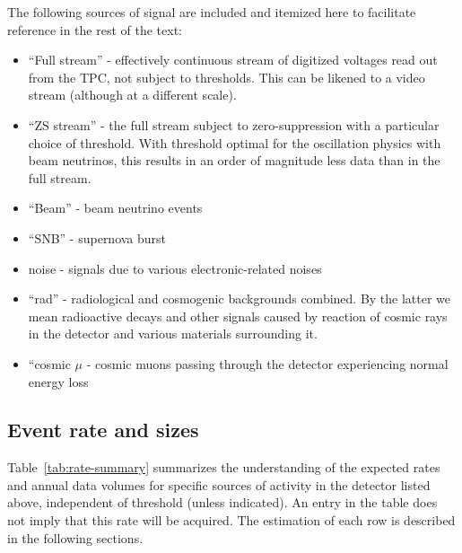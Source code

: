 The following sources of signal are included and itemized here to
facilitate reference in the rest of the text:
\begin{itemize}
\item ``Full stream'' - effectively continuous stream of digitized
  voltages read out from the TPC, not subject to thresholds.
  This can be likened to a video stream (although at a different
  scale).
\item ``ZS stream'' - the full stream subject to zero-suppression with
  a particular choice of threshold.
  With threshold optimal for the oscillation physics with beam
  neutrinos, this results in an order of magnitude less data than in
  the full stream.
\item ``Beam'' - beam neutrino events
\item ``SNB'' - supernova burst
\item noise - signals due to various electronic-related noises
\item ``rad'' - radiological and cosmogenic backgrounds combined.
  By the latter we mean radioactive decays and other signals caused by
  reaction of cosmic rays in the detector and various materials
  surrounding it.
\item ``cosmic $\mu$ - cosmic muons passing through the detector
  experiencing normal energy loss
\end{itemize}

\subsection{Event rate and sizes}

Table~\ref{tab:rate-summary} summarizes the understanding of the
expected rates and annual data volumes for specific sources of
activity in the detector listed above, independent of threshold
(unless indicated).
An entry in the table does not imply that this rate will be acquired.
The estimation of each row is described in the following sections.

